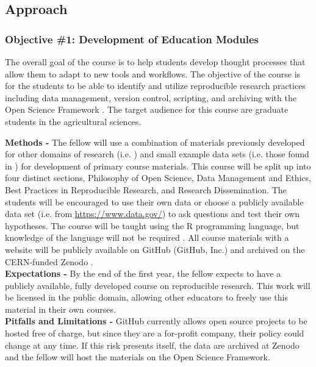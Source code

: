 \documentclass[12pt,letterpaper]{article}
\begin{document}
\subsection{Approach}


\subsubsection*{Objective \#1: Development of Education Modules}

The overall goal of the course is to help students develop thought processes that allow them to adapt to new tools and workflows. 
The objective of the course is for the students to be able to identify and utilize reproducible research practices including data management, version control, scripting, and archiving with the Open Science Framework \citep{nosek2017osf}.
The target audience for this course are graduate students in the agricultural sciences.

\noindent \textbf{Methods -} 
The fellow will use a combination of materials previously developed for other domains of research (i.e. \citet{broman}) and small example data sets (i.e. those found in \citet{sparks2008ecology}) for development of primary course materials. 
This course will be split up into four distinct sections, Philosophy of Open Science, Data Management and Ethics, Best Practices in Reproducible Research, and Research Dissemination.
The students will be encouraged to use their own data or choose a publicly available data set (i.e. from \url{https://www.data.gov/}) to ask questions and test their own hypotheses.
The course will be taught using the R programming language, but knowledge of the language will not be required \citep{R2017}.
All course materials with a website will be publicly available on GitHub (GitHub, Inc.) and archived on the CERN-funded Zenodo \citep{nielsen2017zenodo}.\\
\noindent \textbf{Expectations -}
By the end of the first year, the fellow expects to have a publicly available, fully developed course on reproducible research.
This work will be licensed in the public domain, allowing other educators to freely use this material in their own courses.\\
\noindent \textbf{Pitfalls and Limitations -}
GitHub currently allows open source projects to be hosted free of charge, but since they are a for-profit company, their policy could change at any time. If this risk presents itself, the data are archived at Zenodo and the fellow will host the materials on the Open Science Framework.
\end{document}
